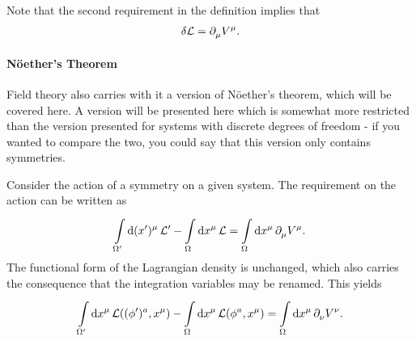 Note that the second requirement in the definition implies that
\begin{align*}
	\var{\ensuremath{\mathcal{L}}} = \partial^{}_{\mu}{V^{\mu}}.
\end{align*}

\paragraph{Nöether's Theorem}
Field theory also carries with it a version of Nöether's theorem, which will be covered here. A version will be presented here which is somewhat more restricted than the version presented for systems with discrete degrees of freedom - if you wanted to compare the two, you could say that this version only contains symmetries.

Consider the action of a symmetry on a given system. The requirement on the action can be written as
\begin{align*}
	\int\limits_{\Omega^{\prime}}^{}\dd{(x\ensuremath{^{\prime}})^{\mu}}{\ensuremath{\mathcal{L}}^{\prime}} - \int\limits_{\Omega}^{}\dd{x^{\mu}}{\ensuremath{\mathcal{L}}} = \int\limits_{\Omega}^{}\dd{x^{\mu}}{\ensuremath{\partial^{}_{\mu}}{V^{\mu}}}.
\end{align*}
The functional form of the Lagrangian density is unchanged, which also carries the consequence that the integration variables may be renamed. This yields
\begin{align*}
	\int\limits_{\Omega^{\prime}}^{}\dd{x^{\mu}}{\ensuremath{\mathcal{L}}((\phi^{\prime})^{a}, x^{\mu})} - \int\limits_{\Omega}^{}\dd{x^{\mu}}{\ensuremath{\mathcal{L}}(\phi^{a}, x^{\mu})} = \int\limits_{\Omega}^{}\dd{x^{\mu}}{\ensuremath{\partial^{}_{\nu}}{V^{\nu}}}.
\end{align*}

